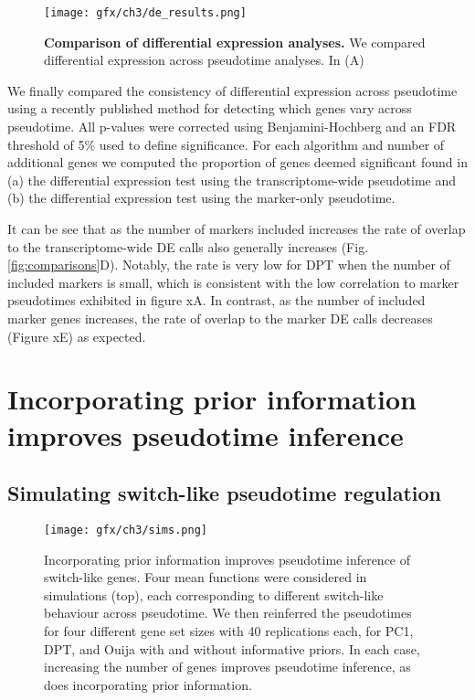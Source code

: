 \begin{figure}%
	\centering
	\texttt{[image: gfx/ch3/de\_results.png]}
	\caption{\textbf{Comparison of differential expression analyses.} We compared differential expression across pseudotime analyses. In (A)  }
	\label{fig:de_results}
\end{figure}

We finally compared the consistency of differential expression across pseudotime using a recently published method for detecting which genes vary across pseudotime. All p-values were corrected using Benjamini-Hochberg and an FDR threshold of 5\% used to define significance. For each algorithm and number of additional genes we computed the proportion of genes deemed significant found in (a) the differential expression test using the transcriptome-wide pseudotime and (b) the differential expression test using the marker-only pseudotime.

It can be see that as the number of markers included increases the rate of overlap to the transcriptome-wide DE calls also generally increases (Fig. \ref{fig:comparisons}D). Notably, the rate is very low for DPT when the number of included markers is small, which is consistent with the low correlation to marker pseudotimes exhibited in figure xA. In contrast, as the number of included marker genes increases, the rate of overlap to the marker DE calls decreases (Figure xE) as expected. 

\section{Incorporating prior information improves pseudotime inference}

\subsection{Simulating switch-like pseudotime regulation}

\begin{figure}%
	\centering
	\texttt{[image: gfx/ch3/sims.png]}
	\caption{Incorporating prior information improves pseudotime inference of switch-like genes. Four mean functions were considered in simulations (top), each corresponding to different switch-like behaviour across pseudotime. We then reinferred the pseudotimes for four different gene set sizes with 40 replications each, for PC1, DPT, and Ouija with and without informative priors. In each case, increasing the number of genes improves pseudotime inference, as does incorporating prior information.}
	\label{fig:simulated_comparison}
\end{figure}

